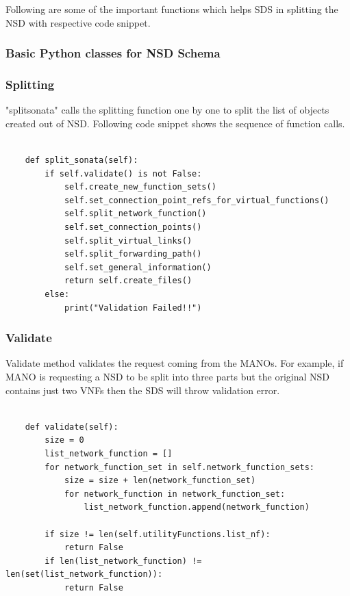 Following are some of the important functions which helps SDS in splitting the NSD with respective code snippet.

\subsubsection{Basic Python classes for NSD Schema}
\subsubsection{Splitting} "splitsonata" calls the splitting function one by one to split the list of objects created out of NSD. Following code snippet shows the sequence of function calls.

\begin{lstlisting}[caption=Sequence of function calls, label=lis:functioncalls]

    def split_sonata(self):
        if self.validate() is not False:
            self.create_new_function_sets()
            self.set_connection_point_refs_for_virtual_functions()
            self.split_network_function()
            self.set_connection_points()
            self.split_virtual_links()
            self.split_forwarding_path()
            self.set_general_information()
            return self.create_files()
        else:
            print("Validation Failed!!")

\end{lstlisting}

\subsubsection{Validate} Validate method validates the request coming from the MANOs. For example, if MANO is requesting a NSD to be split into three parts but the original NSD contains just two VNFs then the SDS will throw validation error.

\begin{lstlisting}[caption=Splitting Request Validation, label=lis:validation]

    def validate(self):
        size = 0
        list_network_function = []
        for network_function_set in self.network_function_sets:
            size = size + len(network_function_set)
            for network_function in network_function_set:
                list_network_function.append(network_function)

        if size != len(self.utilityFunctions.list_nf):
            return False
        if len(list_network_function) != len(set(list_network_function)):
            return False

\end{lstlisting}

